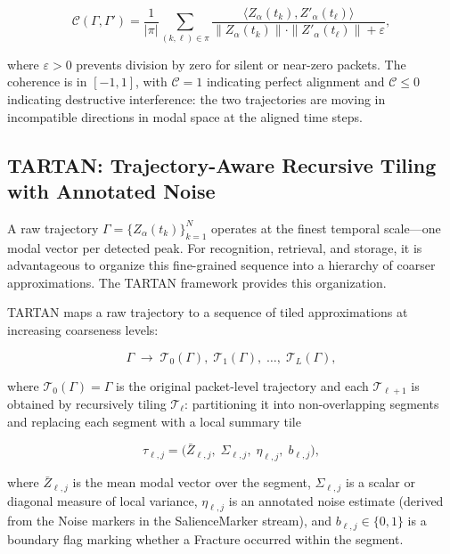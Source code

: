 \documentclass[12pt, a4paper]{article}
\begin{document}
\begin{equation}
\mathcal{C}(\Gamma, \Gamma') = \frac{1}{|\pi|} \sum_{(k,\ell) \in \pi} \frac{\langle Z_\alpha(t_k), Z'_\alpha(t_\ell) \rangle}{\|Z_\alpha(t_k)\| \cdot \|Z'_\alpha(t_\ell)\| + \varepsilon},
\label{eq:Cnorm}
\end{equation}

where $\varepsilon > 0$ prevents division by zero for silent or near-zero packets. The coherence is in $[-1, 1]$, with $\mathcal{C} = 1$ indicating perfect alignment and $\mathcal{C} \leq 0$ indicating destructive interference: the two trajectories are moving in incompatible directions in modal space at the aligned time steps.

\subsection{TARTAN: Trajectory-Aware Recursive Tiling with Annotated Noise}

A raw trajectory $\Gamma = \{Z_\alpha(t_k)\}_{k=1}^N$ operates at the finest temporal scale---one modal vector per detected peak. For recognition, retrieval, and storage, it is advantageous to organize this fine-grained sequence into a hierarchy of coarser approximations. The TARTAN framework provides this organization.

TARTAN maps a raw trajectory to a sequence of tiled approximations at increasing coarseness levels:

\begin{equation}
\Gamma \;\longrightarrow\; \mathcal{T}_0(\Gamma),\; \mathcal{T}_1(\Gamma),\; \ldots,\; \mathcal{T}_L(\Gamma),
\label{eq:tartan}
\end{equation}

where $\mathcal{T}_0(\Gamma) = \Gamma$ is the original packet-level trajectory and each $\mathcal{T}_{\ell+1}$ is obtained by recursively tiling $\mathcal{T}_\ell$: partitioning it into non-overlapping segments and replacing each segment with a local summary tile

\begin{equation}
\tau_{\ell,j} = \bigl(\bar{Z}_{\ell,j},\; \Sigma_{\ell,j},\; \eta_{\ell,j},\; b_{\ell,j}\bigr),
\label{eq:tile}
\end{equation}

where $\bar{Z}_{\ell,j}$ is the mean modal vector over the segment, $\Sigma_{\ell,j}$ is a scalar or diagonal measure of local variance, $\eta_{\ell,j}$ is an annotated noise estimate (derived from the Noise markers in the SalienceMarker stream), and $b_{\ell,j} \in \{0, 1\}$ is a boundary flag marking whether a Fracture occurred within the segment.
\end{document}
